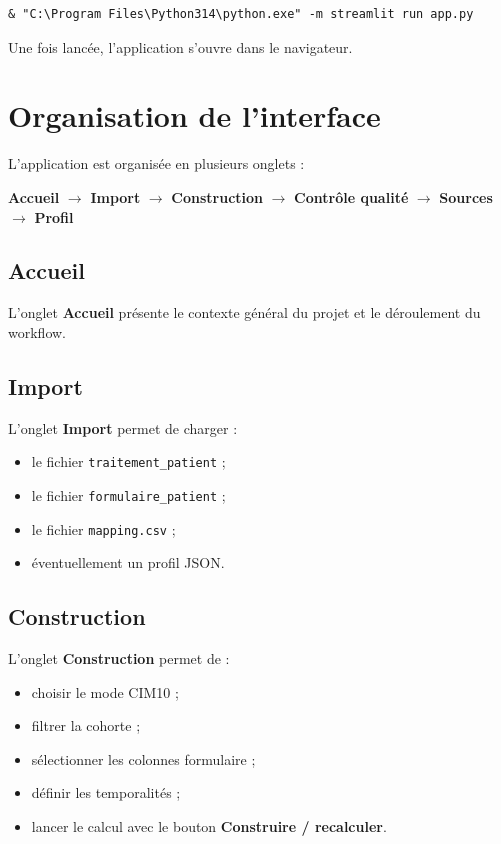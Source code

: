 \documentclass[11pt,a4paper]{article}
\begin{document}
\begin{lstlisting}
& "C:\Program Files\Python314\python.exe" -m streamlit run app.py
\end{lstlisting}

Une fois lancée, l'application s'ouvre dans le navigateur.

\section{Organisation de l'interface}

L'application est organisée en plusieurs onglets :

\begin{center}
\textbf{Accueil}
$\rightarrow$
\textbf{Import}
$\rightarrow$
\textbf{Construction}
$\rightarrow$
\textbf{Contrôle qualité}
$\rightarrow$
\textbf{Sources}
$\rightarrow$
\textbf{Profil}
\end{center}

\subsection{Accueil}

L'onglet \textbf{Accueil} présente le contexte général du projet et le déroulement
du workflow.

\subsection{Import}

L'onglet \textbf{Import} permet de charger :

\begin{itemize}
    \item le fichier \texttt{traitement\_patient} ;
    \item le fichier \texttt{formulaire\_patient} ;
    \item le fichier \texttt{mapping.csv} ;
    \item éventuellement un profil JSON.
\end{itemize}

\subsection{Construction}

L'onglet \textbf{Construction} permet de :

\begin{itemize}
    \item choisir le mode CIM10 ;
    \item filtrer la cohorte ;
    \item sélectionner les colonnes formulaire ;
    \item définir les temporalités ;
    \item lancer le calcul avec le bouton \textbf{Construire / recalculer}.
\end{itemize}
\end{document}
